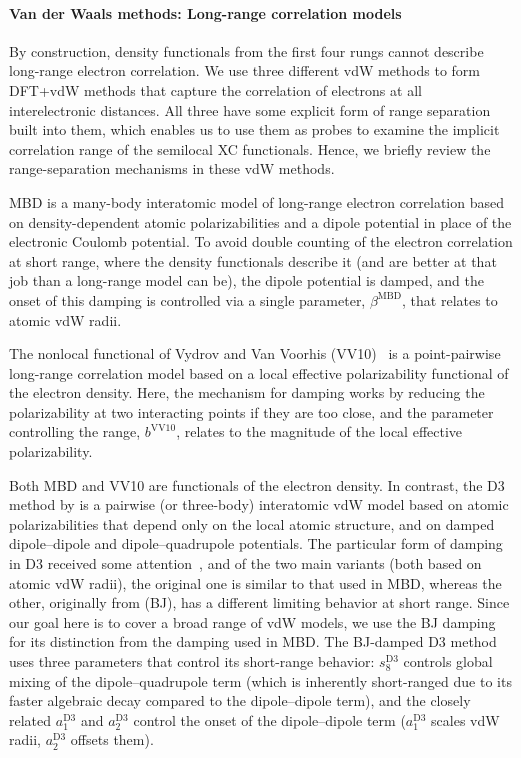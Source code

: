 \paragraph{Van der Waals methods: Long-range correlation models}

By construction, density functionals from the first four rungs cannot describe long-range electron correlation.
We use three different vdW methods to form DFT+vdW methods that capture the correlation of electrons at all interelectronic distances.
All three have some explicit form of range separation built into them, which enables us to use them as probes to examine the implicit correlation range of the semilocal XC functionals.
Hence, we briefly review the range-separation mechanisms in these vdW methods.

MBD is a many-body interatomic model of long-range electron correlation based on density-dependent atomic polarizabilities and a dipole potential in place of the electronic Coulomb potential.
To avoid double counting of the electron correlation at short range, where the density functionals describe it (and are better at that job than a long-range model can be), the dipole potential is damped, and the onset of this damping is controlled via a single parameter, $\beta^\text{MBD}$, that relates to atomic vdW radii.

The nonlocal functional of Vydrov and Van Voorhis (VV10)~\cite{VydrovJCP10a} is a point-pairwise long-range correlation model based on a local effective polarizability functional of the electron density.
Here, the mechanism for damping works by reducing the polarizability at two interacting points if they are too close, and the parameter controlling the range, $b^\text{VV10}$, relates to the magnitude of the local effective polarizability.

Both MBD and VV10 are functionals of the electron density.
In contrast, the D3 method by \citet{GrimmeJCP10} is a pairwise (or three-body) interatomic vdW model based on atomic polarizabilities that depend only on the local atomic structure, and on damped dipole--dipole and dipole--quadrupole potentials.
The particular form of damping in D3 received some attention~\cite{GrimmeJCC11,SchroderJCTC15,SmithJPCL16,WitteJCTC17}, and of the two main variants (both based on atomic vdW radii), the original one is similar to that used in MBD, whereas the other, originally from \citet{JohnsonJCP06} (BJ), has a different limiting behavior at short range.
Since our goal here is to cover a broad range of vdW models, we use the BJ damping for its distinction from the damping used in MBD\@.
The BJ-damped D3 method uses three parameters that control its short-range behavior: $s_8^\text{D3}$ controls global mixing of the dipole--quadrupole term (which is inherently short-ranged due to its faster algebraic decay compared to the dipole--dipole term), and the closely related $a_1^\text{D3}$ and $a_2^\text{D3}$ control the onset of the dipole--dipole term ($a_1^\text{D3}$ scales vdW radii, $a_2^\text{D3}$ offsets them).

